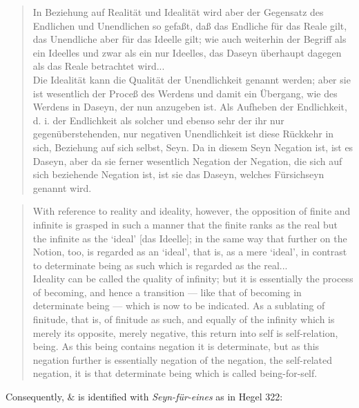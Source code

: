 \documentclass{article}
\begin{document}
\begin{quote}
    In Beziehung auf Realität und Idealität wird aber der Gegensatz des Endlichen und Unendlichen so gefaßt,
daß das Endliche für das Reale gilt, das Unendliche aber für das Ideelle gilt; wie auch weiterhin der
Begriff als ein Ideelles und zwar als ein nur Ideelles, das Daseyn überhaupt dagegen als das Reale betrachtet
wird... \\

    Die Idealität kann die Qualität der Unendlichkeit genannt werden; aber sie ist wesentlich der Proceß
des Werdens und damit ein Übergang, wie des Werdens in Daseyn, der nun anzugeben ist. Als Aufheben der
Endlichkeit, d. i. der Endlichkeit als solcher und ebenso sehr der ihr nur gegenüberstehenden, nur negativen
Unendlichkeit ist diese Rückkehr in sich, Beziehung auf sich selbst, Seyn. Da in diesem Seyn Negation
ist, ist es Daseyn, aber da sie ferner wesentlich Negation der Negation, die sich auf sich beziehende
Negation ist, ist sie das Daseyn, welches Fürsichseyn genannt wird.
\end{quote}

\begin{quote}
    With reference to reality and ideality, however, the opposition of finite and infinite is grasped
in such a manner that the finite ranks as the real but the infinite as the ‘ideal’ [das Ideelle]; in the
same way that further on the Notion, too, is regarded as an ‘ideal’, that is, as a mere ‘ideal’, in contrast
to determinate being as such which is regarded as the real... \\
    
    Ideality can be called the quality of infinity; but it is essentially the process of becoming, and
hence a transition — like that of becoming in determinate being — which is now to be indicated. As a sublating
of finitude, that is, of finitude as such, and equally of the infinity which is merely its opposite, merely
negative, this return into self is self-relation, being. As this being contains negation it is determinate,
but as this negation further is essentially negation of the negation, the self-related negation, it is
that determinate being which is called being-for-self.
\end{quote}

Consequently, $\&$ is identified with \emph{Seyn-für-eines} as in Hegel 322:
\end{document}

